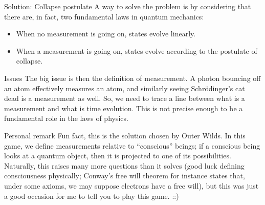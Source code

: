 \documentclass[a4paper]{article}
\begin{document}
\begin{parag}{Solution: Collapse postulate}
    A way to solve the problem is by considering that there are, in fact, two fundamental laws in quantum mechanics:
    \begin{itemize}
        \item When no measurement is going on, states evolve linearly.
        \item When a measurement is going on, states evolve according to the postulate of collapse.
    \end{itemize}

    \begin{subparag}{Issues}
        The big issue is then the definition of measurement. A photon bouncing off an atom effectively measures an atom, and similarly seeing Schrödinger's cat dead is a measurement as well. So, we need to trace a line between what is a measurement and what is time evolution. This is not precise enough to be a fundamental role in the laws of physics. 
    \end{subparag}

    \begin{subparag}{Personal remark}
        Fun fact, this is the solution chosen by Outer Wilds. In this game, we define measurements relative to ``conscious'' beings; if a conscious being looks at a quantum object, then it is projected to one of its possibilities. Naturally, this raises many more questions than it solves (good luck defining consciousness physically; Conway's free will theorem for instance states that, under some axioms, we may suppose electrons have a free will), but this was just a good occasion for me to tell you to play this game. ::)  %
    \end{subparag}
\end{parag}
\end{document}
